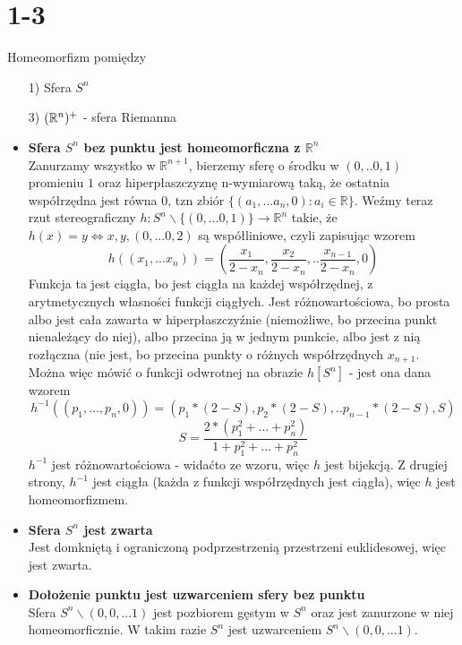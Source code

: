 \newpage
\section*{1-3}
Homeomorfizm pomiędzy
\begin{itemize}
  \item[1)] Sfera $S^n$
  \item[3)] $({\mathbb{R}}^n)^+$ - sfera Riemanna
\end{itemize}
\begin{itemize}
\item \textbf{Sfera $S^n$ bez punktu jest homeomorficzna z $\mathbb{R}^n$}\\
Zanurzamy wszystko w $\mathbb{R}^{n+1}$, bierzemy sferę o środku w $(0, .. 0, 1)$ promieniu $1$ oraz hiperpłaszczyznę n-wymiarową taką, że ostatnia współrzędna jest równa $0$, tzn zbiór $\{(a_1, ... a_n, 0): a_i \in \mathbb{R}\}$.
Weźmy teraz rzut stereograficzny $h: S^n \backslash \{(0, ... 0, 1)\} \rightarrow \mathbb{R}^n$ takie, że $h(x) = y \iff x, y, (0, ... 0, 2)$ są współliniowe, czyli zapisując wzorem
$$
h((x_1, ... x_n)) = (\frac{x_1}{2-x_n}, \frac{x_2}{2-x_n}, .. \frac{x_{n-1}}{2-x_n}, 0)
$$
Funkcja ta jest ciągła, bo jest ciągła na każdej współrzędnej, z arytmetycznych własności funkcji ciągłych.
Jest różnowartościowa, bo prosta albo jest cała zawarta w hiperpłaszczyźnie (niemożliwe, bo przecina punkt nienależący do niej), albo przecina ją w jednym punkcie, albo jest z nią rozłączna (nie jest, bo przecina punkty o różnych współrzędnych $x_{n+1}$.
Można więc mówić o funkcji odwrotnej na obrazie $h[S^n]$ - jest ona dana wzorem
$$
h^{-1}((p_1, ... , p_n, 0)) = (p_1 * (2-S), p_2*(2-S), .. p_{n-1} * (2-S), S)
$$
$$
S = \frac{2*(p_1^2 + ... + p_n^2)}{1 + p_1^2 + ... + p_n^2}
$$
$h^{-1}$ jest różnowartościowa - widaćto ze wzoru, więc $h$ jest bijekcją.
Z drugiej strony, $h^{-1}$ jest ciągła (każda z funkcji współrzędnych jest ciągła), więc $h$ jest homeomorfizmem.

\item \textbf{Sfera $S^n$ jest zwarta}\\
Jest domkniętą i ograniczoną podprzestrzenią przestrzeni euklidesowej, więc jest zwarta.

\item \textbf{Dołożenie punktu jest uzwarceniem sfery bez punktu}\\
Sfera $S^n \backslash (0, 0, ... 1)$ jest pozbiorem gęstym w $S^n$ oraz jest zanurzone w niej homeomorficznie. W takim razie $S^n$ jest uzwarceniem $S^n \backslash (0, 0, ... 1)$.


\end{itemize}
